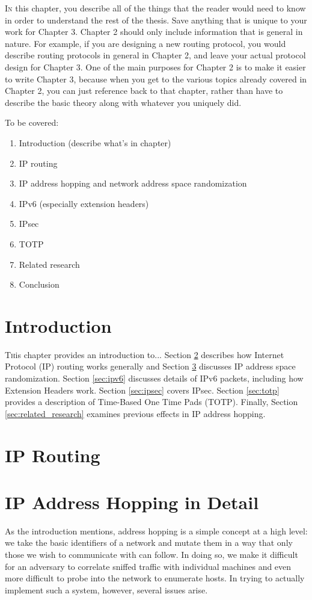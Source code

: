 \lettrine{I}{n} this chapter, you describe all of the things that the reader would need to know in
order to understand the rest of the thesis. Save anything that is unique to your work
for Chapter 3. Chapter 2 should only include information that is general in nature.
For example, if you are designing a new routing protocol, you would describe routing
protocols in general in Chapter 2, and leave your actual protocol design for Chapter 3.
One of the main purposes for Chapter 2 is to make it easier to write Chapter 3,
because when you get to the various topics already covered in Chapter 2, you can just
reference back to that chapter, rather than have to describe the basic theory along with
whatever you uniquely did.

\par To be covered:
\begin{enumerate}
\item Introduction (describe what's in chapter)
\item IP routing
\item IP address hopping and network address space randomization
\item IPv6 (especially extension headers)
\item IPsec
\item TOTP
\item Related research
\item Conclusion
\end{enumerate}

\section{Introduction}
\lettrine{T}his chapter provides an introduction to... Section \ref{sec:routing} describes how Internet Protocol (IP) routing works generally and Section \ref{sec:hopping} discusses IP address space randomization. Section \ref{sec:ipv6} discusses details of IPv6 packets, including how Extension Headers work. Section \ref{sec:ipsec} covers IPsec. %
Section \ref{sec:totp} provides a description of Time-Based One Time Pads (TOTP). Finally, Section \ref{sec:related_research} examines previous effects in IP address hopping.

\section{IP Routing}
\label{sec:routing}
\par 

\section{IP Address Hopping in Detail}
\label{sec:hopping}
\par As the introduction mentions, address hopping is a simple concept at a high level: we take the basic identifiers of a network and mutate them in a way that only those we wish to communicate with can follow. In doing so, we make it difficult for an adversary to correlate sniffed traffic with individual machines and even more difficult to probe into the network to enumerate hosts. In trying to actually implement such a system, however, several issues arise. 

